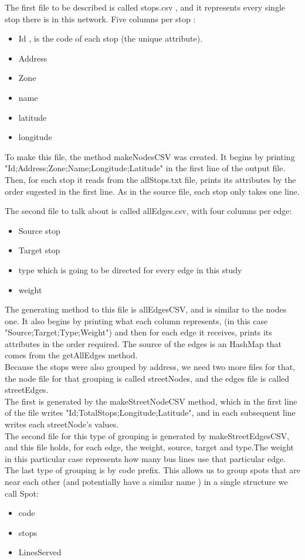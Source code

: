 \documentclass[12pt]{article}
\begin{document}
\begin{multicols}{2}
	
The first file to be described is called stops.csv , and it represents every single stop there is in this network. Five columns per stop :
	
	\begin{itemize}
		\item Id , is the code of each stop (the unique attribute).
		\item Address
		\item Zone
		\item name
		\item latitude
		\item longitude
	\end{itemize}
	
	To make this file, the method makeNodesCSV was created.
	It begins by printing "Id;Address;Zone;Name;Longitude;Latitude" in the first line of the output file. Then, for each stop it reads from the allStops.txt file, prints its attributes by the order sugested in the first line. As in the source file, each stop only takes one line.
	
	The second file to talk about is called allEdges.csv, with four columns per edge:
	
	\begin{itemize}
		\item Source stop
		\item Target stop
		\item type which is going to be directed for every edge in this study
		\item weight 
	\end{itemize}
	
	The generating method to this file is allEdgesCSV, and is similar to the nodes one.
	It also begins by printing what each column represents, (in this case "Source;Target;Type;Weight") and then for each edge it receives, prints its attributes in the order required. The source of the edges is an HashMap that comes from the getAllEdges method.\\

    Because the stops were also grouped by address, we need two more files for that, the node file for that grouping is called streetNodes, and the edges file is called streetEdges.\\
    The first is generated by the makeStreetNodeCSV method, which in the first line of the file writes "Id;TotalStops;Longitude;Latitude", and in each subsequent line writes each streetNode's values. \\
	The second file for this type of grouping  is generated by makeStreetEdgesCSV, and this file holds, for each edge, the weight, source, target and type.The weight in this particular case represents how many bus lines use that particular edge.\\
	The last type of grouping is by code prefix. This allows us to group spots that are near each other (and potentially have a similar name ) in a single structure we call Spot:
\begin{itemize}
	\item code
	\item stops
	\item LinesServed
\end{itemize}
	

\end{multicols}
\end{document}
